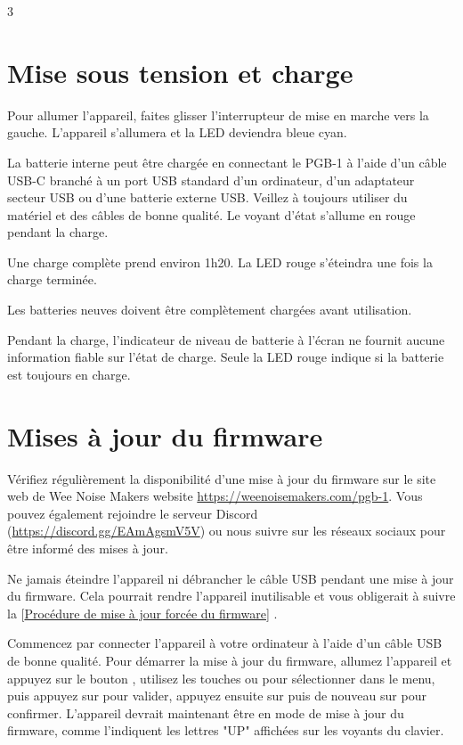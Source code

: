 \documentclass[8pt]{extarticle}
\def\device{PGB-1 }
\def\WNM{Wee Noise Makers }
\def\firmwareupdatesurl{https://weenoisemakers.com/pgb-1}
\def\discordurl{https://discord.gg/EAmAgsmV5V}
\newcommand{\reflabel}[2]{
[\hyperref[#1]{#2}]
}
\begin{document}
\begin{multicols*}{3}


\section{Mise sous tension et charge}

Pour allumer l'appareil, faites glisser l'interrupteur de mise en marche vers la gauche. L'appareil s'allumera et la LED deviendra bleue cyan.

La batterie interne peut être chargée en connectant le \device à l'aide d'un câble USB-C branché à un port USB standard d'un ordinateur, d'un adaptateur secteur USB ou d'une batterie externe USB. Veillez à toujours utiliser du matériel et des câbles de bonne qualité. Le voyant d'état s'allume en rouge pendant la charge.

Une charge complète prend environ 1h20. La LED rouge s'éteindra une fois la charge terminée.
\begin{important}
   Les batteries neuves doivent être complètement chargées avant utilisation.
\end{important}

\begin{important}
    Pendant la charge, l'indicateur de niveau de batterie à l'écran ne fournit aucune information fiable sur l'état de charge. Seule la LED rouge indique si la batterie est toujours en charge.
\end{important}

\section{Mises à jour du firmware}
\label{procedure:firmware_update}

Vérifiez régulièrement la disponibilité d'une mise à jour du firmware sur le site web de \WNM website \url{\firmwareupdatesurl}. Vous pouvez également rejoindre le serveur Discord (\url{\discordurl}) ou nous suivre sur les réseaux sociaux pour être informé des mises à jour.

\begin{important}
    Ne jamais éteindre l'appareil ni débrancher le câble USB pendant une mise à jour du firmware. Cela pourrait rendre l'appareil inutilisable et vous obligerait à suivre la \reflabel{procedures:forced_firmware_update}{Procédure de mise à jour forcée du firmware}.
\end{important}

Commencez par connecter l'appareil à votre ordinateur à l'aide d'un câble USB de bonne qualité. Pour démarrer la mise à jour du firmware, allumez l'appareil et appuyez sur le bouton , utilisez les touches  ou  pour sélectionner  dans le menu, puis appuyez sur  pour valider, appuyez ensuite sur  puis de nouveau sur  pour confirmer. L'appareil devrait maintenant être en mode de mise à jour du firmware, comme l'indiquent les lettres "UP" affichées sur les voyants du clavier.


\end{multicols*}
\end{document}
